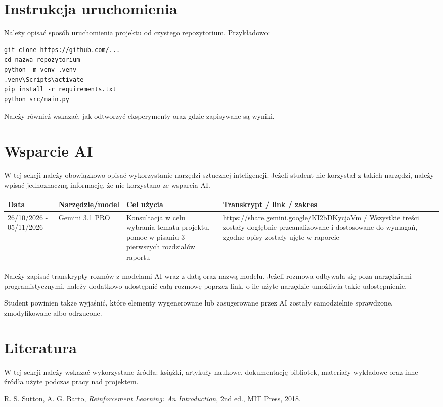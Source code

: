 \documentclass[12pt]{article}
\begin{document}
\section{Instrukcja uruchomienia}

Należy opisać sposób uruchomienia projektu od czystego repozytorium. Przykładowo:

\begin{verbatim}
git clone https://github.com/...
cd nazwa-repozytorium
python -m venv .venv
.venv\Scripts\activate
pip install -r requirements.txt
python src/main.py
\end{verbatim}

Należy również wskazać, jak odtworzyć eksperymenty oraz gdzie zapisywane są wyniki.

\section{Wsparcie AI}

W tej sekcji należy obowiązkowo opisać wykorzystanie narzędzi sztucznej inteligencji. Jeżeli student nie korzystał z takich narzędzi, należy wpisać jednoznaczną informację, że nie korzystano ze wsparcia AI.

\begin{center}
\begin{tabular}{p{}p{}p{}p{}}
\toprule
Data & Narzędzie/model & Cel użycia & Transkrypt / link / zakres \\
\midrule
26/10/2026 - 05/11/2026 & Gemini 3.1 PRO & Konsultacja w celu wybrania tematu projektu, pomoc w pisaniu 3 pierwszych rozdziałów raportu & https://share.gemini.google/KI2bDKycjaVm / Wszystkie treści zostały dogłębnie przeanalizowane i dostosowane do wymagań, zgodne opisy zostały ujęte w raporcie \\
\bottomrule
\end{tabular}
\end{center}

Należy zapisać transkrypty rozmów z modelami AI wraz z datą oraz nazwą modelu. Jeżeli rozmowa odbywała się poza narzędziami programistycznymi, należy dodatkowo udostępnić całą rozmowę poprzez link, o ile użyte narzędzie umożliwia takie udostępnienie.

Student powinien także wyjaśnić, które elementy wygenerowane lub zasugerowane przez AI zostały samodzielnie sprawdzone, zmodyfikowane albo odrzucone.

\section{Literatura}

W tej sekcji należy wskazać wykorzystane źródła: książki, artykuły naukowe, dokumentację bibliotek, materiały wykładowe oraz inne źródła użyte podczas pracy nad projektem.

\begin{thebibliography}{9}
R. S. Sutton, A. G. Barto, \textit{Reinforcement Learning: An Introduction}, 2nd ed., MIT Press, 2018.
\end{thebibliography}
\end{document}
